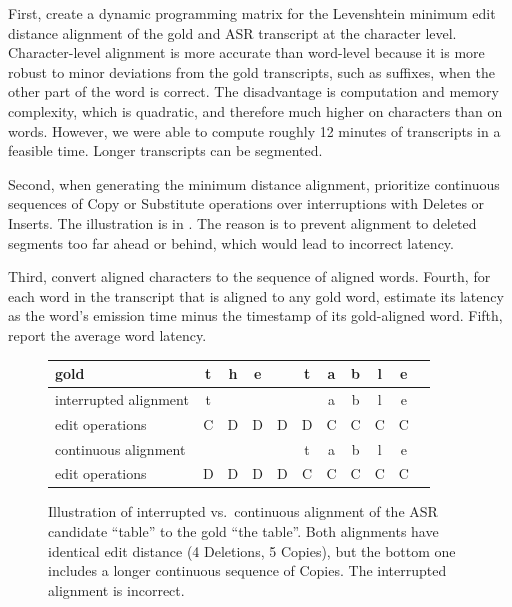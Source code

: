 \documentclass[11pt]{article}
\begin{document}
First, create a dynamic programming matrix for the Levenshtein minimum edit distance alignment of the gold and ASR transcript at the character level. Character-level alignment is more accurate than word-level because it is more robust to minor deviations from the gold transcripts, such as suffixes, when the other part of the word is correct. The disadvantage is computation and memory complexity, which is quadratic, and therefore much higher on characters than on words. However, we were able to compute roughly 12 minutes of transcripts in a feasible time. Longer transcripts can be segmented.

Second, when generating the minimum distance alignment, prioritize continuous sequences of Copy or Substitute operations over interruptions with Deletes or Inserts. The illustration is in . The reason is to prevent alignment to deleted segments too far ahead or behind, which would lead to incorrect latency.

Third, convert aligned characters to the sequence of aligned words. Fourth, for each word in the transcript that is aligned to any gold word, estimate its latency as the word's emission time minus the timestamp of its gold-aligned word. Fifth, report the average word latency.


\begin{figure}
        \centering
        \begin{tabular}{l|c@{~}c@{~}c@{~}c@{~}c@{~}c@{~}c@{~}c@{~}c@{~}c}
         gold    & t & h & e & \textvisiblespace & t & a & b & l & e \\
    \hline
    interrupted alignment  & t &   &   &   &   & a & b & l & e \\
   edit operations        & C & D & D & D & D & C & C & C & C \\
   \hline
   continuous alignment &   &  &  &  & t & a & b & l & e \\
edit operations        & D & D & D & D & C & C & C & C & C \\
        \end{tabular}
    \caption{Illustration of interrupted vs.\ continuous alignment of the ASR candidate ``table'' to the gold ``the table''. Both alignments have identical edit distance (4 Deletions, 5 Copies), but the bottom one includes a longer continuous sequence of Copies. The interrupted alignment is incorrect.}
    \label{fig:alignments}
\end{figure}
\end{document}
